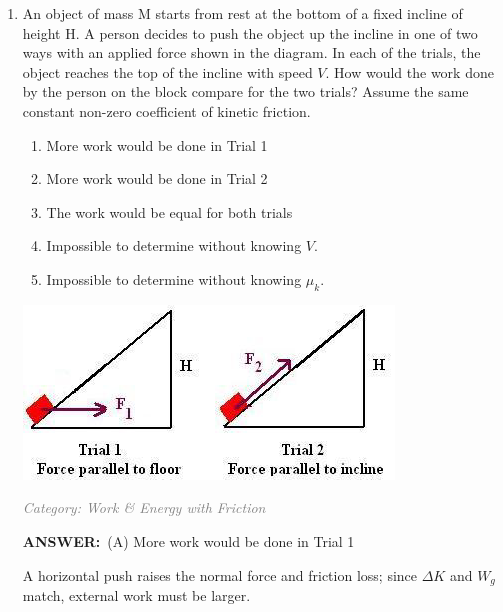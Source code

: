 ﻿\documentclass[12pt, a4paper]{article}
\makeatletter
\newcommand{\finalanswer}[1]{\textbf{ANSWER:}~#1}
\newif\if@categoryprinted
\newcommand{\category}[1]{\if@categoryprinted\relax\else\textit{\textcolor{gray}{Category: #1}}\global\@categoryprintedtrue\fi}
\newcommand{\tags}[1]{}
\makeatother
\begin{document}
\begin{CJK*}{UTF8}{gbsn}
\begin{enumerate}[itemsep=1.0em, topsep=0.6em]
\item \label{prob:14}
\noindent\begin{minipage}[t]{0.6\linewidth}
\vspace{0pt}
An object of mass M starts from rest at the bottom of a fixed incline of height H. A person decides to push the object up the incline in one of two ways with an applied force shown in the diagram. In each of the trials, the object reaches the top of the incline with speed $V$. How would the work done by the person on the block compare for the two trials? Assume the same constant non-zero coefficient of kinetic friction.
\begin{enumerate}[label=(\Alph*)]
    \item More work would be done in Trial 1
    \item More work would be done in Trial 2
    \item The work would be equal for both trials
    \item Impossible to determine without knowing $V$.
    \item Impossible to determine without knowing $\mu_k$.
\end{enumerate}
\end{minipage}%
\hfill
\begin{minipage}[t]{0.35\linewidth}
\vspace{0pt}
\centering
\includegraphics[width=\linewidth]{Problem_14_Figure.png}
\end{minipage}

\category{Work \& Energy with Friction} \tags{}
\begin{answerbox}
\finalanswer{(A) More work would be done in Trial 1}
\end{answerbox}
\begin{insightbox}
A horizontal push raises the normal force and friction loss; since $\Delta K$ and $W_g$ match, external work must be larger.
\end{insightbox}
\begin{solutionbox}


\end{solutionbox}
\end{enumerate}
\end{CJK*}
\end{document}
